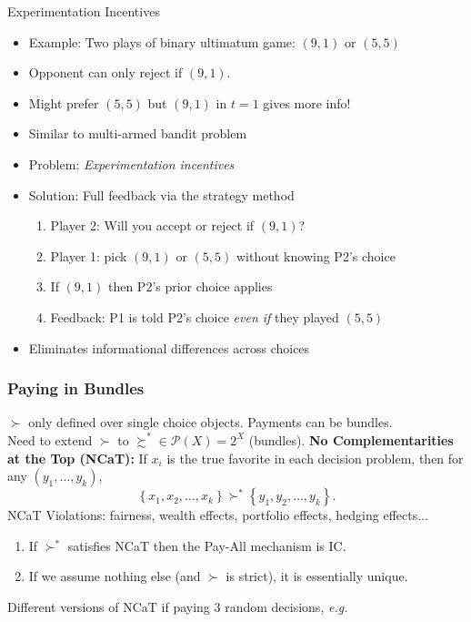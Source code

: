 \begin{frame}{Experimentation Incentives}
\begin{itemize}
    \item Example: Two plays of binary ultimatum game: $(9,1)$ or $(5,5)$
    \item Opponent can only reject if $(9,1)$.
    \item Might prefer $(5,5)$ but $(9,1)$ in $t=1$ gives more info!
    \item Similar to multi-armed bandit problem
    \item Problem: \textit{Experimentation incentives}
    \item Solution: Full feedback via the strategy method
    \begin{enumerate}
        \item Player 2: Will you accept or reject if $(9,1)$?
        \item Player 1: pick $(9,1)$ or $(5,5)$ without knowing P2's choice
        \item If $(9,1)$ then P2's prior choice applies
        \item Feedback: P1 is told P2's choice \textit{even if} they played $(5,5)$
    \end{enumerate}
    \item Eliminates informational differences across choices
\end{itemize}
\end{frame}





\begin{frame}
  \frametitle{Paying in Bundles}
  $\succ$ only defined over single choice objects. Payments can be bundles.\\Need to extend $\succ$ to $\succsim^*\in \mathcal{P}(X)=2^X$ (bundles).
  \br
  \textbf{No Complementarities at the Top (NCaT):} If $x_i$ is the true favorite in each decision problem, then for any $(y_1,\ldots,y_k)$,
  $$
    \left\{x_1,x_2,\ldots,x_k\right\} \succ^* \left\{y_1,y_2,\ldots,y_k\right\}.
  $$
  NCaT Violations: fairness, wealth effects, portfolio effects, hedging effects...
  \br
  \begin{theorem}
  \begin{enumerate}
    \item If $\succ^*$ satisfies NCaT then the Pay-All mechanism is IC.
    \item If we assume nothing else (and $\succ$ is strict), it is essentially unique.
  \end{enumerate}
  \end{theorem}
  Different versions of NCaT if paying 3 random decisions, \emph{e.g.}
\end{frame}

